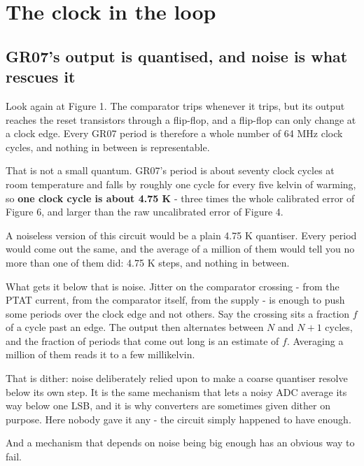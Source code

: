 \section{The clock in the loop}\label{the-clock-in-the-loop}

\subsection{GR07's output is quantised, and noise is what rescues
it}\label{gr07s-output-is-quantised-and-noise-is-what-rescues-it}

Look again at Figure 1. The comparator trips whenever it trips, but its
output reaches the reset transistors through a flip-flop, and a
flip-flop can only change at a clock edge. Every GR07 period is
therefore a whole number of 64 MHz clock cycles, and nothing in between
is representable.

That is not a small quantum. GR07's period is about seventy clock cycles
at room temperature and falls by roughly one cycle for every five kelvin
of warming, so \textbf{one clock cycle is about 4.75 K} - three times
the whole calibrated error of Figure 6, and larger than the raw
uncalibrated error of Figure 4.

A noiseless version of this circuit would be a plain 4.75 K quantiser.
Every period would come out the same, and the average of a million of
them would tell you no more than one of them did: 4.75 K steps, and
nothing in between.

What gets it below that is noise. Jitter on the comparator crossing -
from the PTAT current, from the comparator itself, from the supply - is
enough to push some periods over the clock edge and not others. Say the
crossing sits a fraction \(f\) of a cycle past an edge. The output then
alternates between \(N\) and \(N+1\) cycles, and the fraction of periods
that come out long is an estimate of \(f\). Averaging a million of them
reads it to a few millikelvin.

That is dither: noise deliberately relied upon to make a coarse
quantiser resolve below its own step. It is the same mechanism that lets
a noisy ADC average its way below one LSB, and it is why converters are
sometimes given dither on purpose. Here nobody gave it any - the circuit
simply happened to have enough.

And a mechanism that depends on noise being big enough has an obvious
way to fail.


{
\centering
{}
}

